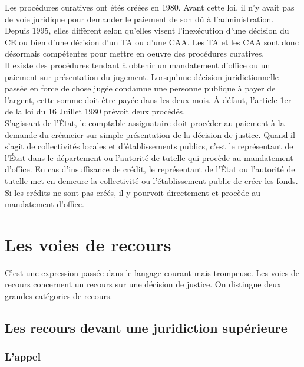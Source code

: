 \documentclass[10pt, a4paper, openany]{book}
\begin{document}
Les procédures curatives ont étés créées en 1980. Avant cette loi, il n'y avait pas de voie juridique pour demander le paiement de son dû à l'administration. \\
Depuis 1995, elles diffèrent selon qu'elles visent l'inexécution d'une décision du CE ou bien d'une décision d'un TA ou d'une CAA. Les TA et les CAA sont donc désormais compétentes pour mettre en oeuvre des procédures curatives. \\
Il existe des procédures tendant à obtenir un mandatement d'office ou un paiement sur présentation du jugement. Lorsqu'une décision juridictionnelle passée en force de chose jugée condamne une personne publique à payer de l'argent, cette somme doit être payée dans les deux mois. À défaut, l'article 1er de la loi du 16 Juillet 1980 prévoit deux procédés. \\
S'agissant de l'État, le comptable assignataire doit procéder au paiement à la demande du créancier sur simple présentation de la décision de justice. Quand il s'agit de collectivités locales et d'établissements publics, c'est le représentant de l'État dans le département ou l'autorité de tutelle qui procède au mandatement d'office. En cas d'insuffisance de crédit, le représentant de l'État ou l'autorité de tutelle met en demeure la collectivité ou l'établissement public de créer les fonds. Si les crédits ne sont pas créés, il y pourvoit directement et procède au mandatement d'office. 

\section{Les voies de recours}

C'est une expression passée dans le langage courant mais trompeuse. Les voies de recours concernent un recours sur une décision de justice. On distingue deux grandes catégories de recours.

\subsection{Les recours devant une juridiction supérieure}

\subsubsection{L'appel}
\end{document}
